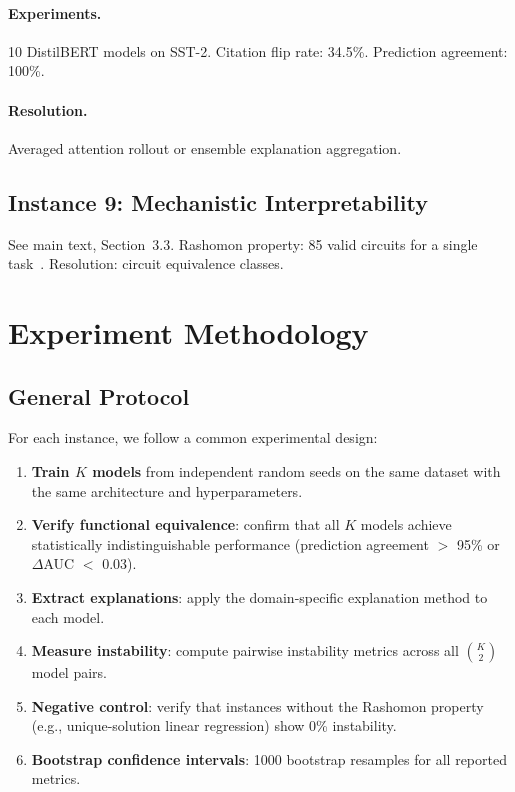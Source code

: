 \documentclass[11pt]{article}
\begin{document}
\paragraph{Experiments.}
10 DistilBERT models on SST-2. Citation flip rate: 34.5\%.
Prediction agreement: 100\%.

\paragraph{Resolution.}
Averaged attention rollout or ensemble explanation aggregation.

\subsection{Instance 9: Mechanistic Interpretability}

See main text, Section~3.3. Rashomon property: 85 valid circuits for a
single task~\cite{meloux2025everything}. Resolution: circuit equivalence
classes.


\section{Experiment Methodology}
\label{sec:si-experiments}

\subsection{General Protocol}

For each instance, we follow a common experimental design:
\begin{enumerate}
  \item \textbf{Train $K$ models} from independent random seeds on the
    same dataset with the same architecture and hyperparameters.
  \item \textbf{Verify functional equivalence}: confirm that all $K$
    models achieve statistically indistinguishable performance (prediction
    agreement $>$ 95\% or $\Delta$AUC $<$ 0.03).
  \item \textbf{Extract explanations}: apply the domain-specific
    explanation method to each model.
  \item \textbf{Measure instability}: compute pairwise instability
    metrics across all $\binom{K}{2}$ model pairs.
  \item \textbf{Negative control}: verify that instances without the
    Rashomon property (e.g., unique-solution linear regression) show
    0\% instability.
  \item \textbf{Bootstrap confidence intervals}: 1000 bootstrap
    resamples for all reported metrics.
\end{enumerate}
\end{document}
